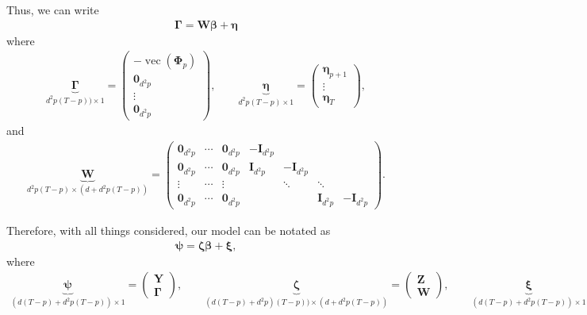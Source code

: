 \documentclass[fleqn]{article}
\begin{document}
Thus, we can write
\begin{align*}
    \bm \Gamma = \bm W \bm \beta + \bm \eta
\end{align*}
where
\begin{align*}
    \underbrace{\bm \Gamma}_{d^2p(T-p)) \times 1} = \begin{pmatrix}
        - \operatorname{vec}(\bm \Phi_p) \\
        \bm 0_{d^2p} \\
        \vdots \\
        \bm 0_{d^2p}
    \end{pmatrix},
    \qquad
    \underbrace{\bm \eta}_{d^2p(T-p) \times 1} = \begin{pmatrix}
        \bm \eta_{p+1} \\
        \vdots \\
        \bm \eta_T
    \end{pmatrix},
\end{align*}
and
\begin{align*}
    \underbrace{\bm W}_{d^2p(T-p) \times (d+d^2p(T-p))} = \begin{pmatrix}
        \bm 0_{d^2p} & \cdots & \bm 0_{d^2p} & - \bm I_{d^2p} &                &              &                \\
        \bm 0_{d^2p} & \cdots & \bm 0_{d^2p} &   \bm I_{d^2p} & - \bm I_{d^2p} &              &                \\
        \vdots       & \cdots & \vdots       &                & \ddots         & \ddots       &                \\
        \bm 0_{d^2p} & \cdots & \bm 0_{d^2p} &                &                & \bm I_{d^2p} & - \bm I_{d^2p}
    \end{pmatrix}.
\end{align*}

Therefore, with all things considered, our model can be notated as
\begin{align*}
    \bm \psi = \bm \zeta \bm \beta + \bm \xi,
\end{align*}
where
\begin{align*}
    \underbrace{\bm \psi}_{(d(T-p)+d^2p(T-p)) \times 1} = \begin{pmatrix}
        \bm Y \\
        \bm \Gamma
    \end{pmatrix},
    \qquad
    \underbrace{\bm \zeta}_{(d(T-p) + d^2p)(T-p)) \times (d + d^2p(T-p))}
    = \begin{pmatrix}
        \bm Z \\
        \bm W
    \end{pmatrix},
    \qquad
    \underbrace{\bm \xi}_{(d(T-p)+d^2p(T-p)) \times 1}
    = \begin{pmatrix}
        \bm \epsilon \\
        \bm \eta
    \end{pmatrix}.
\end{align*}
\end{document}
